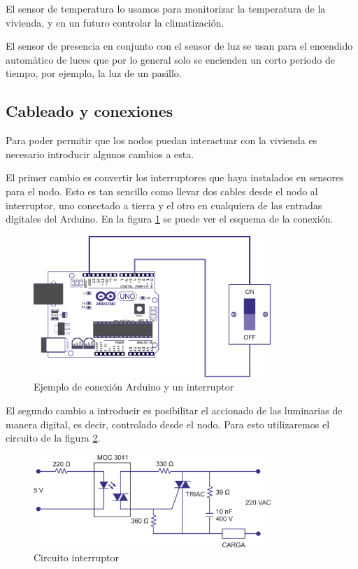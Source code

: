 El sensor de temperatura lo usamos para monitorizar la temperatura de la vivienda, y en un futuro controlar la climatización. 

El sensor de presencia en conjunto con el sensor de luz se usan para el encendido automático de luces que por lo general solo se encienden un corto periodo de tiempo, por ejemplo, la luz de un pasillo.

\subsection{Cableado y conexiones}
 Para poder permitir que los nodos puedan interactuar con la vivienda es necesario introducir algunos cambios a esta.
 
 El primer cambio es convertir los interruptores que haya instalados en sensores para el nodo. Esto es tan sencillo como llevar dos cables desde el nodo al interruptor, uno conectado a tierra y el otro en cualquiera de las entradas digitales del Arduino. En la figura \ref{fig:conexion-ard-int} se puede ver el esquema de la conexión.
 
 \begin{figure}[htb]
     \centering
     \includegraphics[width=0.8\textwidth]{imagenes/arduino_interruptor.png}
     \caption{Ejemplo de conexión Arduino y un interruptor}
     \label{fig:conexion-ard-int}
    \end{figure}
 
 
 El segundo cambio a introducir es posibilitar el accionado de las luminarias de manera digital, es decir, controlado desde el nodo. Para esto utilizaremos el circuito de la figura \ref{fig:circuito_int}. 
 
\begin{figure}[htb]
    \centering
    \includegraphics[width=0.8\textwidth]{imagenes/circuito_interruptor.png}
    \caption{Circuito interruptor}
    \label{fig:circuito_int}
\end{figure}
 
